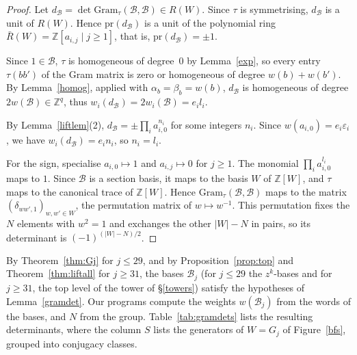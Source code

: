 \documentclass[11pt, reqno]{amsart}
\newcommand{\gram}{\mathrm{Gram}}
\newcommand{\cB}{\mathcal{B}}
\newcommand{\bZ}{\mathbb{Z}}
\numberwithin{equation}{section}
\theoremstyle{remark}
\begin{document}
\begin{proof}
	Let $d_{\cB}=\det\gram_{\tau}(\cB,\cB)\in R(W)$. Since $\tau$ is symmetrising, $d_{\cB}$ is a unit of $R(W)$.
	Hence $\mathrm{pr}(d_{\cB})$ is a unit of the polynomial ring $\bar R(W)=\bZ[a_{i,j}\mid j\ge1]$, that is,
	$\mathrm{pr}(d_{\cB})=\pm1$.
	
	Since $1\in\cB$, $\tau$ is homogeneous of degree~$0$ by Lemma~\ref{exp}, so every entry $\tau(bb')$ of the Gram
	matrix is zero or homogeneous of degree $w(b)+w(b')$. By Lemma~\ref{homog}, applied with
	$\alpha_b=\beta_b=w(b)$, $d_{\cB}$ is homogeneous of degree $2w(\cB)\in \bZ^q$, thus $w_i(d_{\cB})=2w_i(\cB)=e_il_i$.
	
	By Lemma~\ref{liftlem}(2), $d_{\cB}=\pm\prod_ia_{i,0}^{n_i}$ for some integers $n_i$. Since
	$w(a_{i,0})=e_i\varepsilon_i$, we have $w_i(d_{\cB})=e_in_i$, so $n_i=l_i$.
	
	For the sign, specialise $a_{i,0}\mapsto1$ and $a_{i,j}\mapsto0$ for $j\ge1$. The monomial
	$\prod_ia_{i,0}^{l_i}$ maps to $1$. Since $\cB$ is a section basis, it maps to the basis $W$ of $\bZ[W]$, and
	$\tau$ maps to the canonical trace of $\bZ[W]$. Hence $\gram_\tau(\cB,\cB)$ maps to the matrix
	$(\delta_{ww',1})_{w,w'\in W}$, the permutation matrix of $w\mapsto w^{-1}$. This permutation fixes the $N$
	elements with $w^2=1$ and exchanges the other $|W|-N$ in pairs, so its determinant is $(-1)^{(|W|-N)/2}$.
\end{proof}

By Theorem~\ref{thm:Gj} for $j\le29$, and by Proposition~\ref{prop:top} and Theorem~\ref{thm:liftall} for
$j\ge31$, the bases $\cB_j$ (for $j\leq 29$ the $z^k$-bases and for $j\ge31$, the top level of the tower of
		\S\ref{towers}) satisfy the hypotheses of Lemma~\ref{gramdet}. Our programs compute the weights
$w(\cB_j)$ from the words of the bases, and $N$ from the group. Table~\ref{tab:gramdets} lists the
resulting determinants, where the column $S$ lists the generators of $W=G_j$ of Figure~\ref{bfs}, grouped into
		conjugacy classes.
\end{document}
